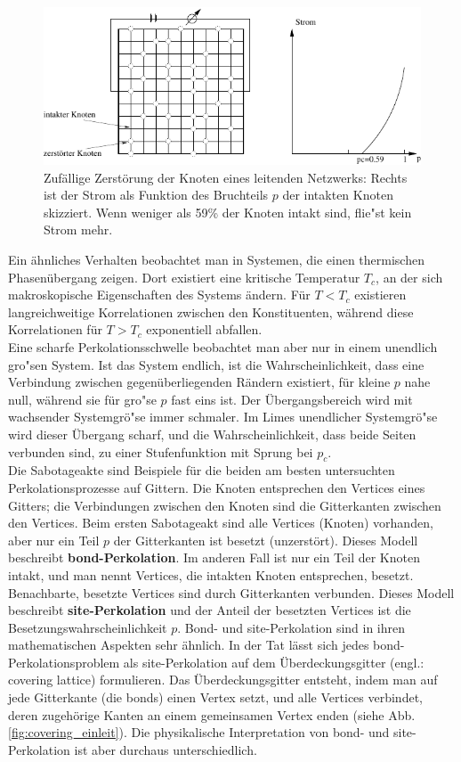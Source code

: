 \begin{figure}[bt]
  \centering
  \includegraphics{./Einleitung-figs/sabosite}
  \caption{Zuf\"allige Zerst\"orung der Knoten eines leitenden Netzwerks: Rechts ist der Strom als Funktion des Bruchteils $p$ der intakten Knoten skizziert. Wenn weniger als 59\% der Knoten intakt sind, flie"st kein Strom mehr.}
  \label{fig:sitesabotage}
\end{figure}
Ein \"ahnliches Verhalten beobachtet man in Systemen, die einen thermischen Phasen\"ubergang zeigen. Dort existiert eine kritische Temperatur $T_c$, an der sich makroskopische Eigenschaften des Systems \"andern. F\"ur $T<T_c$ existieren langreichweitige Korrelationen zwischen den Konstituenten, w\"ahrend diese Korrelationen f\"ur $T>T_c$ exponentiell abfallen. 
\\Eine scharfe Perkolationsschwelle beobachtet man aber nur in einem unendlich gro"sen System. Ist das System endlich, ist die Wahrscheinlichkeit, dass eine Verbindung zwischen gegen\"uberliegenden R\"andern existiert, f\"ur kleine $p$ nahe null, w\"ahrend sie f\"ur gro"se $p$ fast eins ist. Der \"Ubergangsbereich wird mit wachsender Systemgr\"o"se immer schmaler. Im Limes unendlicher Systemgr\"o"se wird dieser \"Ubergang scharf, und die Wahrscheinlichkeit, dass beide Seiten verbunden sind, zu einer Stufenfunktion mit Sprung bei $p_c$. 
\\Die Sabotageakte sind Beispiele f\"ur die beiden am besten untersuchten Perkolationsprozesse auf Gittern. Die Knoten entsprechen den Vertices eines Gitters; die Verbindungen zwischen den Knoten sind die Gitterkanten zwischen den Vertices. Beim ersten Sabotageakt sind alle Vertices (Knoten) vorhanden, aber nur ein Teil $p$ der Gitterkanten ist besetzt (unzerst\"ort). Dieses Modell beschreibt \textbf{bond-Perkolation}. 
Im anderen Fall ist nur ein Teil der Knoten intakt, und man nennt Vertices, die intakten Knoten entsprechen, besetzt. Benachbarte, besetzte Vertices sind durch Gitterkanten verbunden. Dieses Modell beschreibt \textbf{site-Perkolation} und der Anteil der besetzten Vertices ist die Besetzungswahrscheinlichkeit $p$. Bond- und site-Perkolation sind in ihren mathematischen Aspekten sehr \"ahnlich. In der Tat l\"asst sich jedes bond-Perkolationsproblem als site-Perkolation auf dem \"Uberdeckungsgitter (engl.: covering lattice) formulieren. Das \"Uberdeckungsgitter entsteht, indem man auf jede Gitterkante (die bonds) einen Vertex setzt, und alle Vertices verbindet, deren zugeh\"orige Kanten an einem gemeinsamen Vertex enden (siehe Abb. \ref{fig:covering_einleit}). Die physikalische Interpretation von bond- und site-Perkolation ist aber durchaus unterschiedlich.
